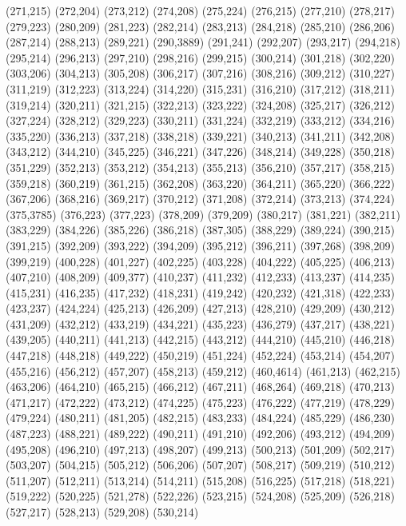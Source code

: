 (271,215)
(272,204)
(273,212)
(274,208)
(275,224)
(276,215)
(277,210)
(278,217)
(279,223)
(280,209)
(281,223)
(282,214)
(283,213)
(284,218)
(285,210)
(286,206)
(287,214)
(288,213)
(289,221)
(290,3889)
(291,241)
(292,207)
(293,217)
(294,218)
(295,214)
(296,213)
(297,210)
(298,216)
(299,215)
(300,214)
(301,218)
(302,220)
(303,206)
(304,213)
(305,208)
(306,217)
(307,216)
(308,216)
(309,212)
(310,227)
(311,219)
(312,223)
(313,224)
(314,220)
(315,231)
(316,210)
(317,212)
(318,211)
(319,214)
(320,211)
(321,215)
(322,213)
(323,222)
(324,208)
(325,217)
(326,212)
(327,224)
(328,212)
(329,223)
(330,211)
(331,224)
(332,219)
(333,212)
(334,216)
(335,220)
(336,213)
(337,218)
(338,218)
(339,221)
(340,213)
(341,211)
(342,208)
(343,212)
(344,210)
(345,225)
(346,221)
(347,226)
(348,214)
(349,228)
(350,218)
(351,229)
(352,213)
(353,212)
(354,213)
(355,213)
(356,210)
(357,217)
(358,215)
(359,218)
(360,219)
(361,215)
(362,208)
(363,220)
(364,211)
(365,220)
(366,222)
(367,206)
(368,216)
(369,217)
(370,212)
(371,208)
(372,214)
(373,213)
(374,224)
(375,3785)
(376,223)
(377,223)
(378,209)
(379,209)
(380,217)
(381,221)
(382,211)
(383,229)
(384,226)
(385,226)
(386,218)
(387,305)
(388,229)
(389,224)
(390,215)
(391,215)
(392,209)
(393,222)
(394,209)
(395,212)
(396,211)
(397,268)
(398,209)
(399,219)
(400,228)
(401,227)
(402,225)
(403,228)
(404,222)
(405,225)
(406,213)
(407,210)
(408,209)
(409,377)
(410,237)
(411,232)
(412,233)
(413,237)
(414,235)
(415,231)
(416,235)
(417,232)
(418,231)
(419,242)
(420,232)
(421,318)
(422,233)
(423,237)
(424,224)
(425,213)
(426,209)
(427,213)
(428,210)
(429,209)
(430,212)
(431,209)
(432,212)
(433,219)
(434,221)
(435,223)
(436,279)
(437,217)
(438,221)
(439,205)
(440,211)
(441,213)
(442,215)
(443,212)
(444,210)
(445,210)
(446,218)
(447,218)
(448,218)
(449,222)
(450,219)
(451,224)
(452,224)
(453,214)
(454,207)
(455,216)
(456,212)
(457,207)
(458,213)
(459,212)
(460,4614)
(461,213)
(462,215)
(463,206)
(464,210)
(465,215)
(466,212)
(467,211)
(468,264)
(469,218)
(470,213)
(471,217)
(472,222)
(473,212)
(474,225)
(475,223)
(476,222)
(477,219)
(478,229)
(479,224)
(480,211)
(481,205)
(482,215)
(483,233)
(484,224)
(485,229)
(486,230)
(487,223)
(488,221)
(489,222)
(490,211)
(491,210)
(492,206)
(493,212)
(494,209)
(495,208)
(496,210)
(497,213)
(498,207)
(499,213)
(500,213)
(501,209)
(502,217)
(503,207)
(504,215)
(505,212)
(506,206)
(507,207)
(508,217)
(509,219)
(510,212)
(511,207)
(512,211)
(513,214)
(514,211)
(515,208)
(516,225)
(517,218)
(518,221)
(519,222)
(520,225)
(521,278)
(522,226)
(523,215)
(524,208)
(525,209)
(526,218)
(527,217)
(528,213)
(529,208)
(530,214)
